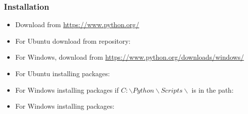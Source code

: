 
\begin{frame}
\frametitle{Installation}

\begin{itemize}
\item Download from \url{https://www.python.org/}
\item For Ubuntu download from repository:

\item For Windows, download from \url{https://www.python.org/downloads/windows/}

\item For Ubuntu installing packages:

\item For Windows installing packages if $C:\backslash Python\backslash Scripts \backslash$ is in the path:

\item For Windows installing packages:


\end{itemize}

\end{frame}
